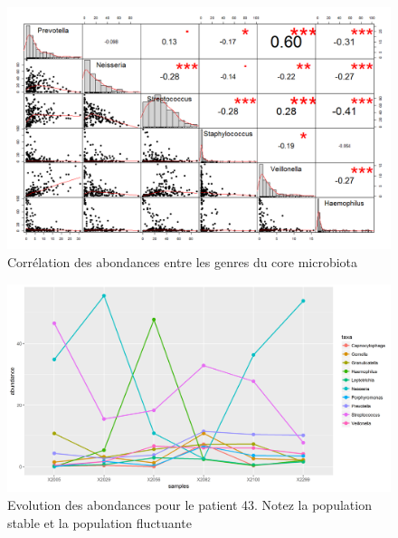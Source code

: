 \documentclass[12pt,a4paper]{article}
\begin{document}
\begin{figure}
\begin{center}
\includegraphics[scale=0.50]{img/small_correlation.png}\hfill
\end{center}
\caption{Corrélation des abondances entre les genres du core microbiota}
\label{correlation}
\end{figure}




\begin{figure}
\begin{center}
\includegraphics[scale=0.60]{img/curve_043.png}\hfill
\end{center}
\caption{Evolution des abondances pour le patient 43. Notez la population stable et la population fluctuante}
\label{evolution43}
\end{figure}
\end{document}
